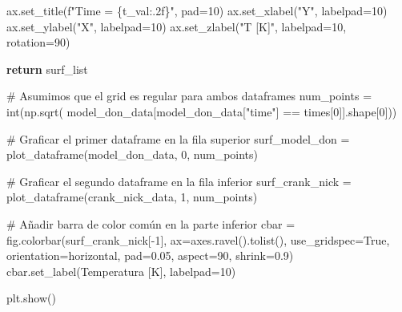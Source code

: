 \documentclass[
  spanish,
  us-letterpaper,
]{scrreprt}
\newenvironment{Shaded}{\begin{snugshade}}{\end{snugshade}}
\newcommand{\BuiltInTok}[1]{\textcolor[rgb]{0.00,0.23,0.31}{#1}}
\newcommand{\CommentTok}[1]{\textcolor[rgb]{0.37,0.37,0.37}{#1}}
\newcommand{\ControlFlowTok}[1]{\textcolor[rgb]{0.00,0.23,0.31}{\textbf{#1}}}
\newcommand{\DecValTok}[1]{\textcolor[rgb]{0.68,0.00,0.00}{#1}}
\newcommand{\FloatTok}[1]{\textcolor[rgb]{0.68,0.00,0.00}{#1}}
\newcommand{\NormalTok}[1]{\textcolor[rgb]{0.00,0.23,0.31}{#1}}
\newcommand{\OperatorTok}[1]{\textcolor[rgb]{0.37,0.37,0.37}{#1}}
\newcommand{\SpecialCharTok}[1]{\textcolor[rgb]{0.37,0.37,0.37}{#1}}
\newcommand{\SpecialStringTok}[1]{\textcolor[rgb]{0.13,0.47,0.30}{#1}}
\newcommand{\StringTok}[1]{\textcolor[rgb]{0.13,0.47,0.30}{#1}}
\newcommand{\VariableTok}[1]{\textcolor[rgb]{0.07,0.07,0.07}{#1}}
\theoremstyle{plain}
\theoremstyle{definition}
\theoremstyle{remark}
\begin{document}
\begin{Shaded}
\begin{Highlighting}[]
\NormalTok{        ax.set\_title(}\SpecialStringTok{f"Time = }\SpecialCharTok{\{}\NormalTok{t\_val}\SpecialCharTok{:.2f\}}\SpecialStringTok{"}\NormalTok{, pad}\OperatorTok{=}\DecValTok{10}\NormalTok{)}
\NormalTok{        ax.set\_xlabel(}\StringTok{"Y"}\NormalTok{, labelpad}\OperatorTok{=}\DecValTok{10}\NormalTok{)}
\NormalTok{        ax.set\_ylabel(}\StringTok{"X"}\NormalTok{, labelpad}\OperatorTok{=}\DecValTok{10}\NormalTok{)}
\NormalTok{        ax.set\_zlabel(}\StringTok{"T [K]"}\NormalTok{, labelpad}\OperatorTok{=}\DecValTok{10}\NormalTok{, rotation}\OperatorTok{=}\DecValTok{90}\NormalTok{)}
    
    \ControlFlowTok{return}\NormalTok{ surf\_list}

\CommentTok{\# Asumimos que el grid es regular para ambos dataframes}
\NormalTok{num\_points }\OperatorTok{=} \BuiltInTok{int}\NormalTok{(np.sqrt(}
\NormalTok{        model\_don\_data[model\_don\_data[}\StringTok{"time"}\NormalTok{] }\OperatorTok{==}\NormalTok{ times[}\DecValTok{0}\NormalTok{]].shape[}\DecValTok{0}\NormalTok{]))}

\CommentTok{\# Graficar el primer dataframe en la fila superior}
\NormalTok{surf\_model\_don }\OperatorTok{=}\NormalTok{ plot\_dataframe(model\_don\_data, }\DecValTok{0}\NormalTok{, num\_points)}

\CommentTok{\# Graficar el segundo dataframe en la fila inferior}
\NormalTok{surf\_crank\_nick }\OperatorTok{=}\NormalTok{ plot\_dataframe(crank\_nick\_data, }\DecValTok{1}\NormalTok{, num\_points)}

\CommentTok{\# Añadir barra de color común en la parte inferior}
\NormalTok{cbar }\OperatorTok{=}\NormalTok{ fig.colorbar(surf\_crank\_nick[}\OperatorTok{{-}}\DecValTok{1}\NormalTok{], ax}\OperatorTok{=}\NormalTok{axes.ravel().tolist(),}
\NormalTok{                    use\_gridspec}\OperatorTok{=}\VariableTok{True}\NormalTok{, orientation}\OperatorTok{=}\StringTok{\textquotesingle{}horizontal\textquotesingle{}}\NormalTok{,}
\NormalTok{                    pad}\OperatorTok{=}\FloatTok{0.05}\NormalTok{, aspect}\OperatorTok{=}\DecValTok{90}\NormalTok{, shrink}\OperatorTok{=}\FloatTok{0.9}\NormalTok{)}
\NormalTok{cbar.set\_label(}\StringTok{\textquotesingle{}Temperatura [K]\textquotesingle{}}\NormalTok{, labelpad}\OperatorTok{=}\DecValTok{10}\NormalTok{)}


\NormalTok{plt.show()}
\end{Highlighting}
\end{Shaded}
\end{document}
